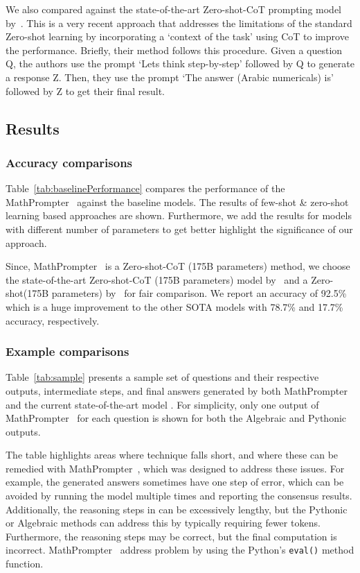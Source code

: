 We also compared against the state-of-the-art Zero-shot-CoT prompting model by~\cite{kojima2022large}. This is a very recent approach that addresses the limitations of the standard Zero-shot learning by incorporating a `context of the task' using CoT to improve the performance. Briefly, their method follows this procedure. Given a question Q, the authors use the prompt `Lets think step-by-step' followed by Q to generate a response Z. Then, they use the prompt `The answer (Arabic numericals) is' followed by Z to get their final result.

\subsection{Results}
\subsubsection{Accuracy comparisons}
Table~\ref{tab:baselinePerformance} compares the performance of the MathPrompter~ against the baseline models. The results of few-shot \& zero-shot learning based approaches are shown. Furthermore, we add the results for models with different number of parameters to get better highlight the significance of our approach.  

Since, MathPrompter~ is a Zero-shot-CoT (175B parameters) method, we choose the state-of-the-art Zero-shot-CoT (175B parameters) model by~\cite{kojima2022large} and a Zero-shot(175B parameters) by~\cite{brown2020language} for fair comparison. We report an accuracy of 92.5\% which is a huge improvement to the other SOTA models with 78.7\% and 17.7\% accuracy, respectively.
\subsubsection{Example comparisons}
Table~\ref{tab:sample} presents a sample set of questions and their respective outputs, intermediate steps, and final answers generated by both MathPrompter and the current state-of-the-art model \cite{kojima2022large}. For simplicity, only one output of MathPrompter~ for each question is shown for both the Algebraic and Pythonic outputs.

The table highlights areas where \cite{kojima2022large} technique falls short, and where these can be remedied with MathPrompter~, which was designed to address these issues. For example, the generated answers sometimes have one step of error, which can be avoided by running the model multiple times and reporting the consensus results. Additionally, the reasoning steps in \cite{kojima2022large} can be excessively lengthy, but the Pythonic or Algebraic methods can address this by typically requiring fewer tokens. Furthermore, the reasoning steps may be correct, but the final computation is incorrect. MathPrompter~ address problem by using the Python's \texttt{eval()} method function.

